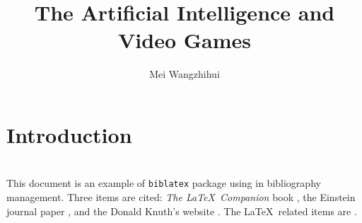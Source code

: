 \documentclass[a4paper,10pt]{article}
\title{The Artificial Intelligence and Video Games}
\author{Mei Wangzhihui}
\begin{document}
\maketitle
\section{Introduction}

\section{}
\section{}
This document is an example of \texttt{biblatex} package using in bibliography management. Three items are cited: \textit{The \LaTeX\ Companion} book \cite{latexcompanion}, the Einstein journal paper \cite{einstein}, and the Donald Knuth's website \cite{knuthwebsite}. The \LaTeX\ related items are \cite{latexcompanion,knuthwebsite}. 
 
\medskip

\printbibliography
\end{document}
